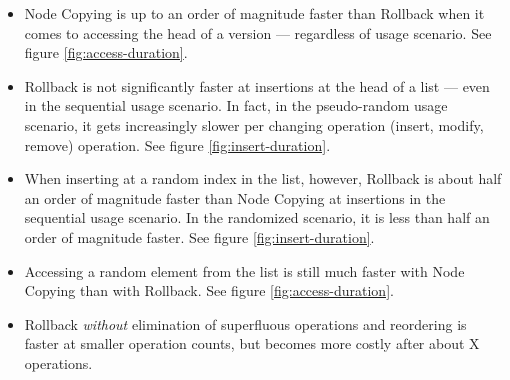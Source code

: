 \begin{itemize}
  \item Node Copying is up to an order of magnitude faster than Rollback
  when it comes to accessing the head of a version --- regardless of usage
  scenario. See figure \ref{fig:access-duration}.

  \item Rollback is not significantly faster at insertions at the head of a list
  --- even in the sequential usage scenario. In fact, in the pseudo-random usage
  scenario, it gets increasingly slower per changing operation (insert, modify,
  remove) operation. See figure \ref{fig:insert-duration}.

  \item When inserting at a random index in the list, however, Rollback is about
  half an order of magnitude faster than Node Copying at insertions in the
  sequential usage scenario. In the randomized scenario, it is less than half an
  order of magnitude faster. See figure \ref{fig:insert-duration}.

  \item Accessing a random element from the list is still much faster with Node
  Copying than with Rollback. See figure \ref{fig:access-duration}.

  \item Rollback \emph{without} elimination of superfluous operations and
  reordering is faster at smaller operation counts, but becomes more costly
  after about X operations.

\end{itemize}


